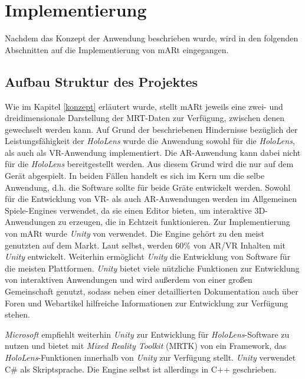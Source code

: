 
\chapter{Implementierung}
\label{implementierung}

Nachdem das Konzept der Anwendung beschrieben wurde, wird in den folgenden Abschnitten auf die Implementierung von mARt eingegangen. 

\section{Aufbau Struktur des Projektes}

Wie im Kapitel \ref{konzept} erläutert wurde, stellt mARt jeweils eine zwei- und dreidimensionale Darstellung der MRT-Daten zur Verfügung, zwischen denen gewechselt werden kann. Auf Grund der beschriebenen Hindernisse bezüglich der Leistungsfähigkeit der \textit{HoloLens} wurde die Anwendung sowohl für die \textit{HoloLens}, als auch als VR-Anwendung implementiert. Die AR-Anwendung kann dabei nicht für die \textit{HoloLens} bereitgestellt werden. Aus diesem Grund wird die nur auf dem Gerät abgespielt. In beiden Fällen handelt es sich im Kern um die selbe Anwendung, d.h. die Software sollte für beide Gräte entwickelt werden. 
Sowohl für die Entwicklung von VR- als auch AR-Anwendungen werden im Allgemeinen Spiele-Engines verwendet, da sie einen Editor bieten, um interaktive 3D-Anwendungen zu erzeugen, die in Echtzeit funktionieren. 
Zur Implementierung von mARt wurde \textit{Unity} von \cite{unity} verwendet. Die Engine gehört zu den meist genutzten auf dem Markt. Laut \cite{unityRelations} selbst, werden 60\% von AR/VR Inhalten mit \textit{Unity} entwickelt. Weiterhin ermöglicht \textit{Unity} die Entwicklung von Software für die meisten Plattformen. \textit{Unity} bietet viele nützliche Funktionen zur Entwicklung von interaktiven Anwendungen und wird außerdem von einer großen  Gemeinschaft genutzt, sodass neben einer detaillierten Dokumentation auch über Foren und Webartikel hilfreiche Informationen zur Entwicklung zur Verfügung stehen.

\textit{Microsoft} empfiehlt weiterhin \textit{Unity} zur Entwicklung für \textit{HoloLens}-Software zu nutzen \cite{unityHololens} und bietet mit \textit{Mixed Reality Toolkit} (MRTK) von \cite{holoToolkit} ein Framework, das \textit{HoloLens}-Funktionen innerhalb von \textit{Unity} zur Verfügung stellt.
\textit{Unity} verwendet C\# als Skriptsprache. Die Engine selbst ist allerdings in C++ geschrieben.

